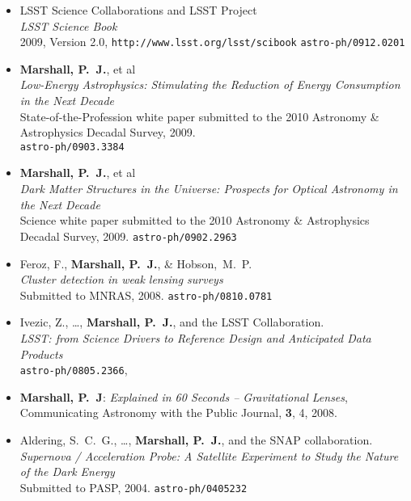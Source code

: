 \begin{itemize}


\item{LSST Science Collaborations and LSST Project \\
\textit{LSST Science Book}\\
2009, Version 2.0, \texttt{http://www.lsst.org/lsst/scibook}
\texttt{astro-ph/0912.0201}
}

\item{\textbf{{Marshall}, P.~J.}, et al\\
\textit{Low-Energy Astrophysics: Stimulating the Reduction of Energy
Consumption in the Next Decade}\\
State-of-the-Profession white paper submitted to the 2010 Astronomy \& Astrophysics Decadal Survey, 2009.\\
\texttt{astro-ph/0903.3384}
}

\item{\textbf{{Marshall}, P.~J.}, et al\\
\textit{Dark Matter Structures in the Universe: Prospects for Optical Astronomy in the Next Decade}\\
Science white paper submitted to the 2010 Astronomy \& Astrophysics Decadal Survey, 2009.
\texttt{astro-ph/0902.2963}
}

\item{{Feroz}, F., \textbf{{Marshall}, P.~J.}, \& {Hobson},~M.~P.\\
\textit{Cluster detection in weak lensing surveys}\\
Submitted to MNRAS, 2008.
\texttt{astro-ph/0810.0781}
}

\item{{Ivezic}, Z., \ldots, \textbf{{Marshall}, P.~J.}, and the LSST Collaboration.\\
\textit{LSST: from Science Drivers to Reference Design and Anticipated Data Products}\\
\texttt{astro-ph/0805.2366},
}

\item{\textbf{Marshall, P.~J}:
\textit{Explained in 60 Seconds -- Gravitational Lenses},\\
Communicating Astronomy with the Public Journal, \textbf{3}, 4, 2008.
}

\item{{Aldering}, S.~C.~G., \ldots, \textbf{{Marshall}, P.~J.}, and the SNAP collaboration.\\
\textit{Supernova / Acceleration Probe: A Satellite Experiment to Study the Nature of the Dark Energy}\\
Submitted to PASP, 2004.
\texttt{astro-ph/0405232}
}

\end{itemize}

